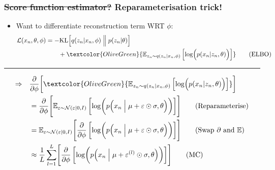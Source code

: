 \documentclass[xcolor=table,dvipsnames]{beamer}
\begin{document}
\begin{frame}[t]
    \frametitle{\sout{Score function estimator?} Reparameterisation trick!}
    \begin{itemize}
        \item Want to differentiate \textcolor{OliveGreen}{reconstruction} term WRT $\phi$:
        \begin{align*}
            \mathcal{L}(x_n, \theta, \phi) &= -\text{KL}\Bigl[q(z_n \vert x_n, \phi) \Bigm\Vert p(z_n \vert \theta)\Bigr] \\
            &\qquad + \textcolor{OliveGreen}{\mathbb{E}_{z_n\sim q(z_n \vert x_n, \phi)}\left[ \log \Bigl(p(x_n \vert z_n, \theta)\Bigr) \right]} \tag{ELBO}
        \end{align*}
    \end{itemize}
    \hrule
    \begin{align*}
        \Rightarrow\quad & \frac{\partial}{\partial\phi}\biggl[\textcolor{OliveGreen}{\mathbb{E}_{z_n\sim q(z_n \vert x_n, \phi)}\left[ \log \Bigl(p(x_n \vert z_n, \theta)\Bigr) \right]}\biggr] \\
        &= \frac{\partial}{\partial\phi}\Biggl[\mathbb{E}_{\varepsilon \sim \mathcal{N}(\varepsilon \vert 0, I)}\left[ \log \biggl(p\Bigl(x_n \Bigm\vert \mu + \varepsilon \odot \sigma, \theta\Bigr)\biggr) \right]\Biggr] \tag{Reparameterise} \\
        &= \mathbb{E}_{\varepsilon \sim \mathcal{N}(\varepsilon \vert 0, I)}\Biggl[\frac{\partial}{\partial\phi}\left[ \log \biggl(p\Bigl(x_n \Bigm\vert \mu + \varepsilon \odot \sigma, \theta\Bigr)\biggr) \right]\Biggr] \tag{Swap $\partial$ and $\mathbb{E}$} \\
        &\approx \frac{1}{L}\sum_{l=1}^L\Biggl[\frac{\partial}{\partial\phi}\left[ \log \biggl(p\Bigl(x_n \Bigm\vert \mu + \varepsilon^{(l)} \odot \sigma, \theta\Bigr)\biggr) \right]\Biggr] \tag{MC}
    \end{align*}
\end{frame}
\end{document}
